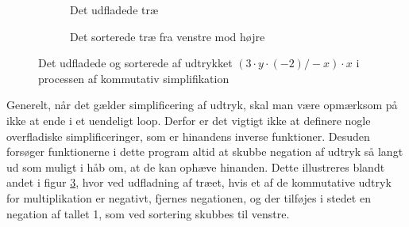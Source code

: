 \documentclass{article}
\begin{document}
\begin{figure}[H]
  \centering
  \begin{subfigure}[b]{0.45\textwidth}
    \centering
    \caption{Det udfladede træ}
    \label{fig:sub1}
  \end{subfigure}
  \hfill
  \begin{subfigure}[b]{0.45\textwidth}
    \centering
    \caption{Det sorterede træ fra venstre mod højre}
    \label{fig:sub2}
  \end{subfigure}
  \caption{Det udfladede og sorterede af udtrykket $(3 \cdot y \cdot (-2)/-x) \cdot x$ i processen af kommutativ simplifikation}
  \label{fig:trees}
\end{figure}

Generelt, når det gælder simplificering af udtryk, skal man være opmærksom på ikke at ende i et uendeligt loop. Derfor er det vigtigt ikke at definere nogle overfladiske simplificeringer, som er hinandens inverse funktioner. Desuden forsøger funktionerne i dette program altid at skubbe negation af udtryk så langt ud som muligt i håb om, at de kan ophæve hinanden. Dette illustreres blandt andet i figur \ref{fig:trees}, hvor ved udfladning af træet, hvis et af de kommutative udtryk for multiplikation er negativt, fjernes negationen, og der tilføjes i stedet en negation af tallet 1, som ved sortering skubbes til venstre.
\end{document}
